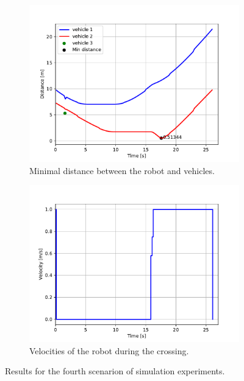             \begin{figure}[ht]
                \centering
                \begin{subfigure}{0.49\linewidth}
                    \centering
                    \includegraphics[trim={24 8 40 41}, clip, width=\linewidth]{images/simulations/scene4_2_dist.pdf}
                    \caption{Minimal distance between the robot and vehicles.}
                \end{subfigure}
                \begin{subfigure}{0.49\linewidth}
                    \centering
                    \includegraphics[trim={21 8 40 41}, clip, width=\linewidth]{images/simulations/scene4_2_vel.pdf}
                    \caption{Velocities of the robot during the crossing.}
                \end{subfigure}
                \caption{Results for the fourth scenarion of simulation experiments.}
                \label{fig:scene4_2_graphs}
            \end{figure}
